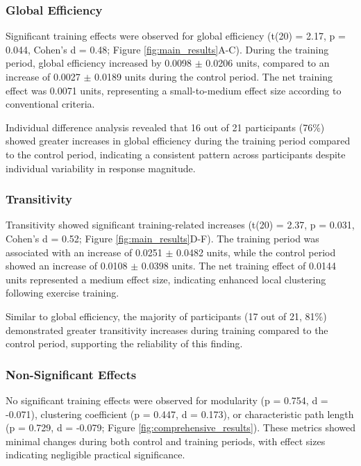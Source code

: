 \documentclass[12pt,a4paper]{article}
\begin{document}
\subsubsection{Global Efficiency}

Significant training effects were observed for global efficiency (t(20) = 2.17, p = 0.044, Cohen's d = 0.48; Figure \ref{fig:main_results}A-C). During the training period, global efficiency increased by 0.0098 $\pm$ 0.0206 units, compared to an increase of 0.0027 $\pm$ 0.0189 units during the control period. The net training effect was 0.0071 units, representing a small-to-medium effect size according to conventional criteria.

Individual difference analysis revealed that 16 out of 21 participants (76\%) showed greater increases in global efficiency during the training period compared to the control period, indicating a consistent pattern across participants despite individual variability in response magnitude.

\subsubsection{Transitivity}

Transitivity showed significant training-related increases (t(20) = 2.37, p = 0.031, Cohen's d = 0.52; Figure \ref{fig:main_results}D-F). The training period was associated with an increase of 0.0251 $\pm$ 0.0482 units, while the control period showed an increase of 0.0108 $\pm$ 0.0398 units. The net training effect of 0.0144 units represented a medium effect size, indicating enhanced local clustering following exercise training.

Similar to global efficiency, the majority of participants (17 out of 21, 81\%) demonstrated greater transitivity increases during training compared to the control period, supporting the reliability of this finding.

\subsubsection{Non-Significant Effects}

No significant training effects were observed for modularity (p = 0.754, d = -0.071), clustering coefficient (p = 0.447, d = 0.173), or characteristic path length (p = 0.729, d = -0.079; Figure \ref{fig:comprehensive_results}). These metrics showed minimal changes during both control and training periods, with effect sizes indicating negligible practical significance.
\end{document}
